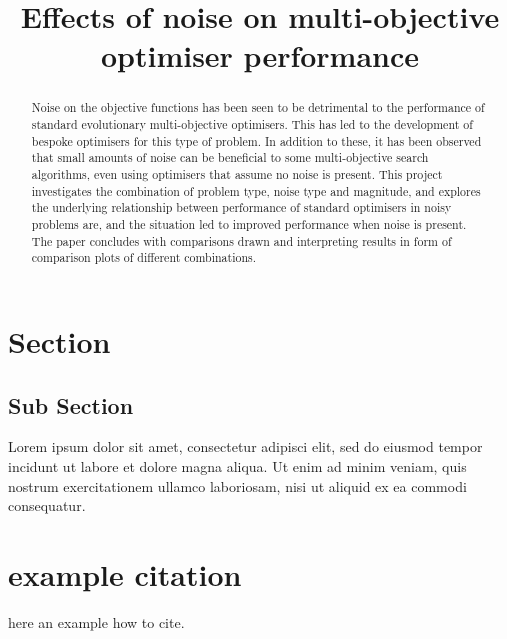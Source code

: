 \documentclass[conference,a4paper]{IEEEtran}
\begin{document}
\title{Effects of noise on multi-objective optimiser performance}

\author{       
}

\maketitle

\begin{abstract}
  Noise on the objective functions has been seen to be detrimental to the performance of standard evolutionary multi-objective optimisers. This has led to the development of bespoke optimisers for this type of problem. In addition to these, it has been observed that small amounts of noise can be beneficial to some multi-objective search algorithms, even using optimisers that assume no noise is present. This project investigates the combination of problem type, noise type and magnitude, and explores the underlying relationship between performance of standard optimisers in noisy problems are, and the situation led to improved performance when noise is present. The paper concludes with comparisons drawn and interpreting results in form of comparison plots of different combinations.
\end{abstract}


\section{Section}\label{sec:introduction}


\subsection{Sub Section}\label{sec:subsection}
Lorem ipsum dolor sit amet, consectetur adipisci elit, sed do eiusmod tempor incidunt ut labore et dolore magna aliqua. Ut enim ad minim veniam, quis nostrum exercitationem ullamco laboriosam, nisi ut aliquid ex ea commodi consequatur.

\section{example citation}

here an example how to cite\cite{stella2018bots,saracco2015randomizing}.
\end{document}
